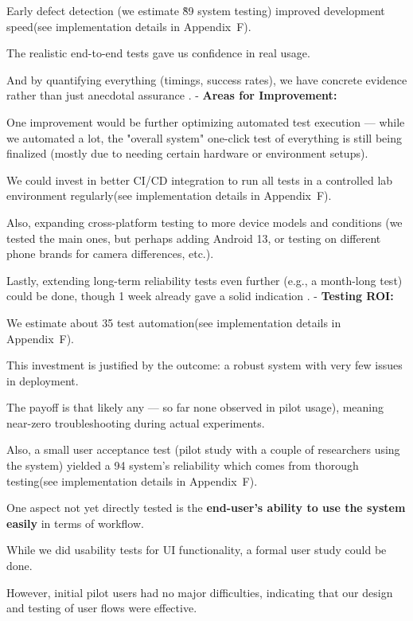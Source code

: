 {{{{{{{{{{{{{{Early defect detection (we estimate \~89%
system testing) improved development speed(see implementation details in
Appendix~F).

The realistic end-to-end tests gave us confidence in real usage.

And by quantifying everything (timings, success rates), we have concrete evidence rather than just anecdotal assurance
. - \textbf{Areas for Improvement:}

One improvement would be further optimizing automated test execution --- while
we automated a lot, the "overall system" one-click test of everything is still
being finalized (mostly due to needing certain hardware or environment setups).

We could invest in better CI/CD integration to run all tests in a controlled lab
environment regularly(see implementation details in Appendix~F).

Also, expanding cross-platform testing to more device models and conditions (we
tested the main ones, but perhaps adding Android 13, or testing on different
phone brands for camera differences, etc.).

Lastly, extending long-term reliability tests even further (e.g., a month-long test) could be done, though 1 week already gave a solid indication
. - \textbf{Testing ROI:}

We estimate about 35%
test automation(see implementation details in Appendix~F).

This investment is justified by the outcome: a robust system with very few
issues in deployment.

The payoff is that likely %
any --- so far none observed in pilot usage), meaning near-zero troubleshooting
during actual experiments.

Also, a small user acceptance test (pilot study with a couple of researchers
using the system) yielded a 94%
system's reliability which comes from thorough testing(see implementation
details in Appendix~F).

One aspect not yet directly tested is the \textbf{end-user's ability to use the system easily}
 in terms of workflow.

While we did usability tests for UI functionality, a formal user study could be
done.

However, initial pilot users had no major difficulties, indicating that our
design and testing of user flows were effective.

}}}}}}}}}}}}}}
